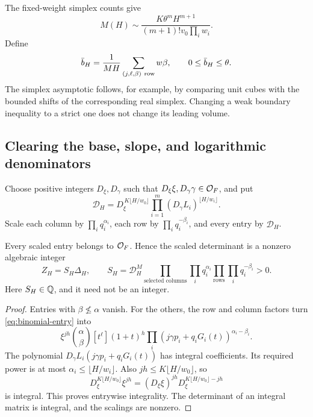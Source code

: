 The fixed-weight simplex counts give
\begin{equation}\label{eq:row-count}
 M(H)\sim
 \frac{K\theta^m H^{m+1}}{(m+1)!v_0\prod_iw_i}.
\end{equation}
Define
\begin{equation}\label{eq:mean}
 \bar b_H=\frac1{MH}\sum_{(j,\ell,\beta)\ {\rm row}}w\beta,
 \qquad 0\le\bar b_H\le\theta.
\end{equation}
The simplex asymptotic follows, for example, by comparing unit cubes
with the bounded shifts of the corresponding real simplex. Changing
a weak boundary inequality to a strict one does not change its leading
volume.

\subsection{Clearing the base, slope, and logarithmic denominators}

Choose positive integers \(D_\xi,D_\gamma\) such that
\(D_\xi\xi,D_\gamma\gamma\in\mathcal O_F\), and put
\begin{equation}\label{eq:common-denominator}
 \mathcal D_H=
 D_\xi^{\,K\lfloor H/w_0\rfloor}
 \prod_{i=1}^m(D_\gamma L_i)^{\lfloor H/w_i\rfloor}.
\end{equation}
Scale each column by \(\prod_iq_i^{\alpha_i}\), each row by
\(\prod_iq_i^{-\beta_i}\), and every entry by \(\mathcal D_H\).

\begin{lemma}\label{lem:integral}
Every scaled entry belongs to \(\mathcal O_F\). Hence the scaled determinant
is a nonzero algebraic integer
\[
 Z_H=S_H\Delta_H,\qquad
 S_H=\mathcal D_H^M
   \prod_{\text{selected columns}}\prod_iq_i^{\alpha_i}
   \prod_{\text{rows}}\prod_iq_i^{-\beta_i}>0.
\]
Here \(S_H\in\mathbb Q\), and it need not be an integer.
\end{lemma}
\begin{proof}
Entries with \(\beta\not\le\alpha\) vanish.
For the others, the row and column factors turn
\eqref{eq:binomial-entry} into
\[
 \xi^{jh}\binom{\alpha}{\beta}
 [t^\ell](1+t)^h
   \prod_i(j\gamma p_i+q_iG_i(t))^{\alpha_i-\beta_i}.
\]
The polynomial
\(D_\gamma L_i(j\gamma p_i+q_iG_i(t))\)
has integral coefficients. Its required power is at most
\(\alpha_i\le\lfloor H/w_i\rfloor\).
Also \(jh\le K\lfloor H/w_0\rfloor\), so
\[
 D_\xi^{K\lfloor H/w_0\rfloor}\xi^{jh}
 =(D_\xi\xi)^{jh}D_\xi^{K\lfloor H/w_0\rfloor-jh}
\]
is integral. This proves entrywise integrality.
The determinant of an integral matrix is integral, and the scalings
are nonzero.
\end{proof}

